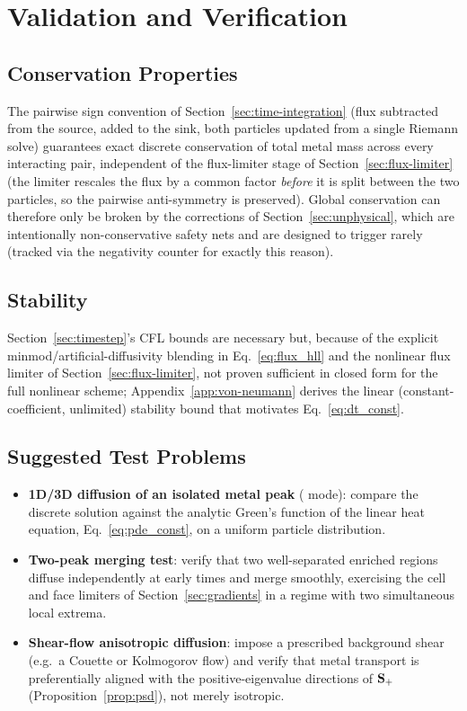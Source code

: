 \section{Validation and Verification}

\subsection{Conservation Properties}
The pairwise sign convention of Section~\ref{sec:time-integration}
(flux subtracted from the source, added to the sink, both particles
updated from a single Riemann solve) guarantees exact discrete
conservation of total metal mass across every interacting pair,
independent of the flux-limiter stage of Section~\ref{sec:flux-limiter}
(the limiter rescales the flux by a common factor \emph{before} it is
split between the two particles, so the pairwise anti-symmetry is
preserved). Global conservation can therefore only be broken by the
 corrections of Section~\ref{sec:unphysical}, which are
intentionally non-conservative safety nets and are designed to trigger
rarely (tracked via the negativity counter for exactly this reason).

\subsection{Stability}
Section~\ref{sec:timestep}'s CFL bounds are necessary but, because of
the explicit minmod/artificial-diffusivity blending in
Eq.~\eqref{eq:flux_hll} and the nonlinear flux limiter of
Section~\ref{sec:flux-limiter}, not proven sufficient in closed form for
the full nonlinear scheme; Appendix~\ref{app:von-neumann} derives the
linear (constant-coefficient, unlimited) stability bound that motivates
Eq.~\eqref{eq:dt_const}.

\subsection{Suggested Test Problems}
\begin{itemize}
  \item \textbf{1D/3D diffusion of an isolated metal peak}
        ( mode): compare the discrete solution
        against the analytic Green's function of the linear heat
        equation, Eq.~\eqref{eq:pde_const}, on a uniform particle
        distribution.
  \item \textbf{Two-peak merging test}: verify that two well-separated
        enriched regions diffuse independently at early times and merge
        smoothly, exercising the cell and face limiters of
        Section~\ref{sec:gradients} in a regime with two simultaneous
        local extrema.
  \item \textbf{Shear-flow anisotropic diffusion}: impose a prescribed
        background shear (e.g.\ a Couette or Kolmogorov flow) and verify
        that metal transport is preferentially aligned with the
        positive-eigenvalue directions of $\mathbf{S}_{+}$
        (Proposition~\ref{prop:psd}), not merely isotropic.
\end{itemize}
